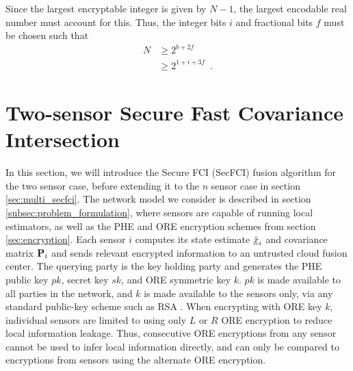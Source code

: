 \documentclass[letterpaper, 10 pt, conference]{ieeeconf}  %
\begin{document}
Since the largest encryptable integer is given by $N-1$, the largest encodable real number must account for this. Thus, the integer bits $i$ and fractional bits $f$ must be chosen such that
\begin{equation}\label{eqn:qmn_max}
   \begin{aligned}
      N &\geq 2^{b+2f}\\
      &\geq 2^{1+i+3f}\enspace.
   \end{aligned}
\end{equation}




\section{Two-sensor Secure Fast Covariance Intersection} \label{sec:secfci}
In this section, we will introduce the Secure FCI (SecFCI) fusion algorithm for the two sensor case, before extending it to the $n$ sensor case in section \ref{sec:multi_secfci}. The network model we consider is described in section \ref{subsec:problem_formulation}, where sensors are capable of running local estimators, as well as the PHE and ORE encryption schemes from section \ref{sec:encryption}. Each sensor $i$ computes its state estimate $\hat{{\underline{x}}}_i$ and covariance matrix ${{\mathbf{P}}}_i$ and sends relevant encrypted information to an untrusted cloud fusion center. The querying party is the key holding party and generates the PHE public key $pk$, secret key $sk$, and ORE symmetric key $k$. $pk$ is made available to all parties in the network, and $k$ is made available to the sensors only, via any standard public-key scheme such as RSA \cite{rivestMethodObtainingDigital1978}. When encrypting with ORE key $k$, individual sensors are limited to using only $L$ or $R$ ORE encryption to reduce local information leakage. Thus, consecutive ORE encryptions from any sensor cannot be used to infer local information directly, and can only be compared to encryptions from sensors using the alternate ORE encryption.
\end{document}
